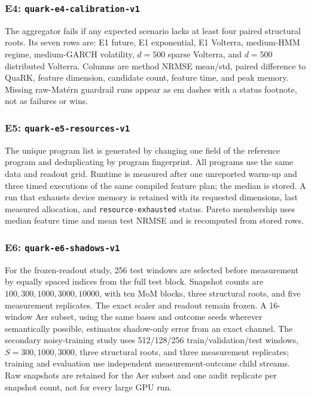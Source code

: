 \subsubsection{E4: \texttt{quark-e4-calibration-v1}}
The aggregator fails if any expected scenario lacks at least four paired
structural roots.  Its seven rows are: E1 future, E1 exponential, E1 Volterra,
medium-HMM regime, medium-GARCH volatility, \(d=500\) sparse Volterra, and
\(d=500\) distributed Volterra.  Columns are method NRMSE mean/std, paired
difference to QuaRK, feature dimension, candidate count, feature time, and
peak memory.  Missing raw-Mat\'ern guardrail runs appear as em dashes with a
status footnote, not as failures or wins.

\subsubsection{E5: \texttt{quark-e5-resources-v1}}
The unique program list is generated by changing one field of the reference
program and deduplicating by program fingerprint.  All programs use the same
data and readout grid.  Runtime is measured after one unreported warm-up and
three timed executions of the same compiled feature plan; the median is stored.
A run that exhausts device memory is retained with its requested dimensions,
last measured allocation, and \texttt{resource-exhausted} status.  Pareto
membership uses median feature time and mean test NRMSE and is recomputed from
stored rows.

\subsubsection{E6: \texttt{quark-e6-shadows-v1}}
For the frozen-readout study, 256 test windows are selected before measurement
by equally spaced indices from the full test block.  Snapshot counts are
\(100,300,1000,3000,10000\), with ten MoM blocks, three structural roots, and
five measurement replicates.  The exact scaler and readout remain frozen.
A 16-window Aer subset, using the same bases and outcome seeds wherever
semantically possible, estimates shadow-only error from an exact channel.  The
secondary noisy-training study uses 512/128/256 train/validation/test windows,
\(S=300,1000,3000\), three structural roots, and three measurement replicates;
training and evaluation use independent measurement-outcome child streams.
Raw snapshots are retained for the Aer subset and one audit replicate per
snapshot count, not for every large GPU run.


